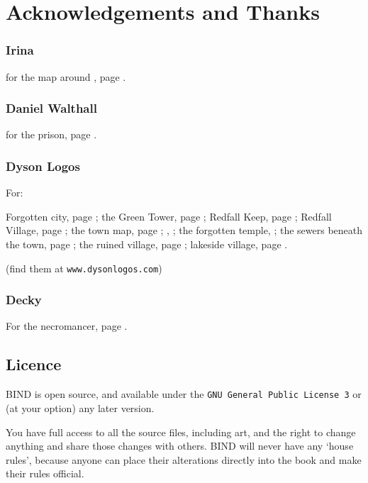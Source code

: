 \section*{Acknowledgements and Thanks}

\begin{multicols}{2}

\subsubsection{Irina}
for the map around , page \pageref{Irina/greylands}.

\subsubsection{Daniel Walthall}
for the prison, page \pageref{Daniel_Walthall/prison}.

\subsubsection{Dyson Logos}

For:

Forgotten city, page \pageref{Dyson_Logos/forgotten_city};
the Green Tower, page \pageref{Dyson_Logos/green_tower};
Redfall Keep, page \pageref{Dyson_Logos/redfall_keep};
Redfall Village, page \pageref{Dyson_Logos/redfall};
the town map, page \pageref{Dyson_Logos/town};
, \pageref{Dyson_Logos/mincing_pig};
the forgotten temple, \pageref{Dyson_Logos/qualme_temple};
the sewers beneath the town, page \pageref{Dyson_Logos/sewer};
the ruined village, page \pageref{Dyson_Logos/ruined_village};
lakeside village, page \pageref{Dyson_Logos/lakeside}.

(find them at {\tt www.dysonlogos.com})

\subsubsection{Decky}

For the necromancer, page \pageref{Decky/necromancer}.

\subsection*{Licence}

BIND is open source, and available under the {\tt GNU General Public License 3} or (at your option) any later version.

You have full access to all the source files, including art, and the right to change anything and share those changes with others.
BIND will never have any `house rules', because anyone can place their alterations directly into the book and make their rules official.

\end{multicols}
